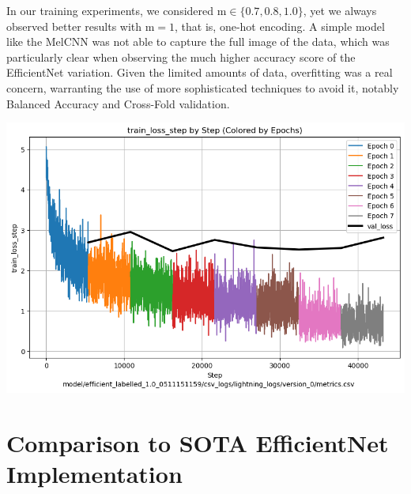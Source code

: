 \documentclass[11pt]{article}
\begin{document}
\begin{minipage}{0.48\linewidth}

  In our training experiments, we considered $\text{m} \in \{0.7, 0.8, 1.0\}$, yet we always observed better results with $\text{m} = 1$, that is, one-hot encoding. A simple model like the MelCNN was not able to capture the full image of the data, which was particularly clear when observing the much higher accuracy score of the EfficientNet variation. Given the limited amounts of data, overfitting was a real concern, warranting the use of more sophisticated techniques to avoid it, notably Balanced Accuracy and Cross-Fold validation.
\end{minipage}
\hfill
\begin{minipage}{0.48\linewidth}
  \includegraphics[width=\linewidth]{img/efficient_loss_accuracy_plot.png}
\end{minipage}

\section*{Comparison to SOTA EfficientNet Implementation}
\end{document}
